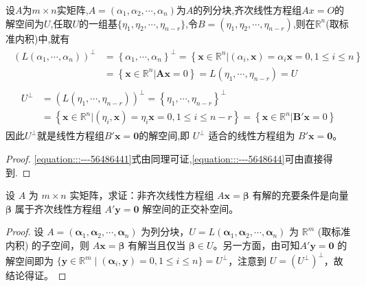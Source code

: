 \documentclass[../../main.tex]{subfiles}
\begin{document}
\begin{corollary}\label{corollary:齐次方程的解空间是其系数矩阵的正交补空间}
设$A$为$m\times n$实矩阵,$A=(\alpha_1,\alpha_2,\cdots,\alpha_n)$为$A$的列分块,齐次线性方程组$Ax=O$的解空间为$U$,任取$U$的一组基$\{\eta_1,\eta_2,\cdots,\eta_{n-r}\}$,令$B=(\eta_1,\eta_2,\cdots,\eta_{n-r})$,则在$\mathbb{R}^n$(取标准内积)中,就有
\begin{align}\label{equation:::---56486441}
\begin{aligned}
\left( L\left( \alpha _1,\cdots ,\alpha _n \right) \right) ^{\bot}&=\left\{ \alpha _1,\cdots ,\alpha _n \right\} ^{\bot}=\left\{ \boldsymbol{x}\in \mathbb{R} ^n|\left( \alpha _i,\boldsymbol{x} \right) =\alpha _i\boldsymbol{x}=0,1\le i\le n \right\} 
\\
&=\left\{ \boldsymbol{x}\in \mathbb{R} ^n|\boldsymbol{Ax}=0 \right\} =L\left( \eta _1,\cdots ,\eta _{n-r} \right) =U
\end{aligned}
\end{align}
\begin{align}\label{equation:::---5648644}
\begin{aligned}
U^{\bot}&=\left( L\left( \eta _1,\cdots ,\eta _{n-r} \right) \right) ^{\bot}=\left\{ \eta _1,\cdots ,\eta _{n-r} \right\} ^{\bot}
\\
&=\left\{ \boldsymbol{x}\in \mathbb{R} ^n|\left( \eta _i,\boldsymbol{x} \right) =\eta _i\boldsymbol{x}=0,1\le i\le n-r \right\} =\left\{ \boldsymbol{x}\in \mathbb{R} ^n|\boldsymbol{B}'\boldsymbol{x}=0 \right\} 
\end{aligned}
\end{align}
因此$U^{\perp}$就是线性方程组$B'\boldsymbol{x} = \boldsymbol{0}$的解空间,即 $U^{\perp}$ 适合的线性方程组为 $B'\boldsymbol{x} = \boldsymbol{0}$。
\end{corollary}
\begin{proof}
\eqref{equation:::---56486441}式由同理可证,\eqref{equation:::---5648644}可由直接得到.
\end{proof}

\begin{proposition}\label{proposition:例9.21}
设 $A$ 为 $m \times n$ 实矩阵，求证：非齐次线性方程组 $A\boldsymbol{x} = \boldsymbol{\beta}$ 有解的充要条件是向量 $\boldsymbol{\beta}$ 属于齐次线性方程组 $A'\boldsymbol{y} = \boldsymbol{0}$ 解空间的正交补空间。
\end{proposition}
\begin{proof}
设 $A = (\boldsymbol{\alpha}_1, \boldsymbol{\alpha}_2, \cdots, \boldsymbol{\alpha}_n)$ 为列分块，$U = L(\boldsymbol{\alpha}_1, \boldsymbol{\alpha}_2, \cdots, \boldsymbol{\alpha}_n)$ 为 $\mathbb{R}^m$ (取标准内积) 的子空间，则 $A\boldsymbol{x} = \boldsymbol{\beta}$ 有解当且仅当 $\boldsymbol{\beta} \in U$。另一方面，由可知$A'\boldsymbol{y} = \boldsymbol{0}$ 的解空间即为 $\{\boldsymbol{y} \in \mathbb{R}^m \mid (\boldsymbol{\alpha}_i, \boldsymbol{y}) = 0, 1 \leq i \leq n\} = U^{\perp}$，注意到 $U = (U^{\perp})^{\perp}$，故结论得证。
\end{proof}
\end{document}
